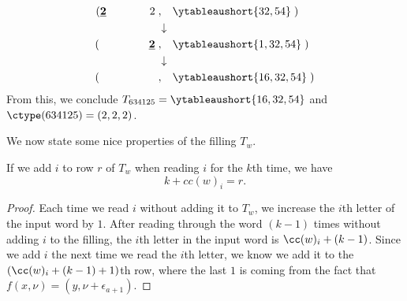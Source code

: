 \begin{ex}
{\begin{align*}
     ( \mathbf{\underline{2}} \ \hspace{.2cm} \  \hspace{.2cm}  \  \hspace{.2cm} \ \hspace{.2cm} \ 2 \hspace{.1cm}&, \hspace{.3cm}\ytableaushort{32,54}\hspace{.1cm}) 
     \\ &\downarrow\\ 
     ( \hspace{.2cm}\ \hspace{.2cm} \  \hspace{.2cm}  \  \hspace{.2cm} \ \hspace{.2cm} \ \mathbf{\underline{2}}  \hspace{.1cm}&,\hspace{.3cm} \ytableaushort{1,32,54}\hspace{.1cm}) 
 \\ &\downarrow\\ 
     ( \hspace{.2cm}\ \hspace{.2cm} \  \hspace{.2cm}  \  \hspace{.2cm} \ \hspace{.2cm} \ \hspace{.2cm} \hspace{.1cm} &, \hspace{.3cm}\ytableaushort{16,32,54}\hspace{.1cm}) 
    \end{align*}}
    From this, we conclude $T_{634125} = \ytableaushort{16,32,54}$ and $\ctype(634125) = (2,2,2)$.
\end{ex}
We now state some nice properties of the filling $T_w$. 

\begin{lemma}\label{lemma:row is sum of cocharge label and mult}
    If we add $i$ to row $r$ of $T_w$ when reading $i$ for the $k$th time, we have
    \[k + cc(w)_i = r.\]
\end{lemma}
\begin{proof}
    Each time we read $i$ without adding it to $T_w$, we increase the $i$th letter of the input word by $1$. 
    After reading through the word $(k-1)$ times without adding $i$ to the filling, the $i$th letter in the input word is $\cc(w)_i + (k-1)$.
    Since we add $i$ the next time we read the $i$th letter, we know we add it to the $(\cc(w)_i + (k-1)+1)$th row, where the last $1$ is coming from the fact that $f(x,\nu) = (y,\nu +\epsilon_{a+1})$. 
\end{proof}

